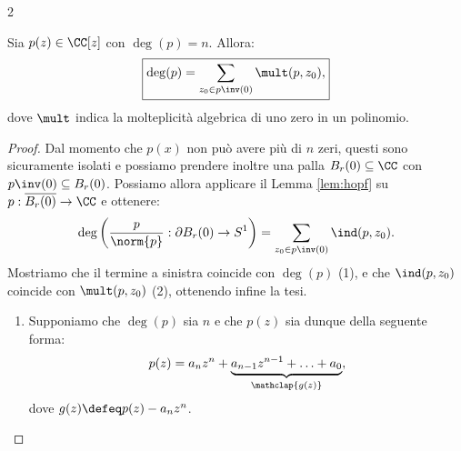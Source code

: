 \begin{multicols*}{2}
    \begin{theorem}
        Sia $p(z) \in \CC[z]$ con $\deg(p) = n$. Allora:
        \[
            \boxed{\deg(p) = \sum_{z_0 \in p\inv(0)} \mult(p, z_0),}
        \]
        dove $\mult$ indica la molteplicità algebrica di uno zero in un polinomio.
    \end{theorem}

    \begin{proof}
        Dal momento che $p(x)$ non può avere più di $n$ zeri, questi sono sicuramente
        isolati e possiamo prendere inoltre una palla $B_r(0) \subseteq \CC$ con
        $p\inv(0) \subseteq B_r(0)$. Possiamo allora applicare il Lemma \ref{lem:hopf}
        su $p : \overline{B_r(0)} \to \CC$ e ottenere:
        \[
            \deg\left(\frac{p}{\norm{p}} : \partial B_r(0) \to S^1 \right) = \sum_{z_0 \in p\inv(0)} \ind(p, z_0).
        \]
        Mostriamo che il termine a sinistra coincide con $\deg(p)$ (1), e che $\ind(p, z_0)$ coincide
        con $\mult(p, z_0)$ (2), ottenendo infine la tesi.

        \begin{enumerate}[(1)]
            \item Supponiamo che $\deg(p)$ sia $n$ e che $p(z)$ sia dunque della seguente forma:
                  \[
                      p(z) = a_n z^n + \underbrace{a_{n-1} z^{n-1} + \ldots + a_0}_{\mathclap{g(z)}},
                  \]
                  dove $g(z) \defeq p(z) - a_n z^n$. \smallskip


\end{enumerate}
\end{proof}
\end{multicols*}
